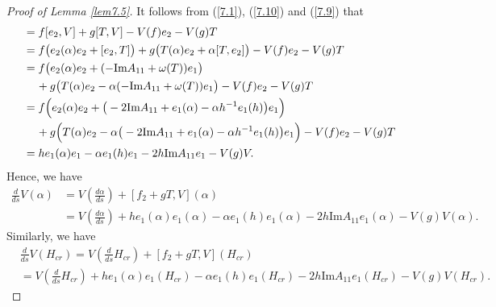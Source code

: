 \documentclass{amsart}
\theoremstyle{Corollary}
\numberwithin{equation}{section}
\begin{document}
\begin{proof}[Proof of Lemma \ref{lem7.5}]
It follows from  (\ref{7.1}), (\ref{7.10}) and (\ref{7.9})  that
\begin{align*}
[f_2+gT,V]
&=f[e_2,V]+g[T,V]-V(f)e_2-V(g)T\\
&=f\big(e_2(\alpha)e_2+[e_2,T]\big)
+g\big(T(\alpha)e_2+\alpha[T,e_2]\big)-V(f)e_2-V(g)T\\
&=f\big(e_2(\alpha)e_2+(-\mbox{Im}A_{11}+\omega(T))e_1\big)\\
&\hspace{4mm}
+g\big(T(\alpha)e_2-\alpha (-\mbox{Im}A_{11}+\omega(T))e_1\big)-V(f)e_2-V(g)T\\
&=f\Big(e_2(\alpha)e_2+\big(-2\mbox{Im}A_{11}+e_1(\alpha)-\alpha h^{-1}e_1(h)\big)e_1\Big)\\
&\hspace{4mm}
+g\Big(T(\alpha)e_2-\alpha\big(-2\mbox{Im}A_{11}+e_1(\alpha)-\alpha h^{-1}e_1(h)\big)e_1\Big)-V(f)e_2-V(g)T\\
&=h e_1(\alpha)e_1-\alpha e_1(h)e_1-2h\mbox{Im}A_{11}e_1
-V(g)V.
\end{align*}  
Hence, we have 
\begin{align*}
\frac{d}{ds}V(\alpha)
&=V\left(\frac{d\alpha}{ds}\right)+[f_2+gT,V](\alpha)\\
&=V\left(\frac{d\alpha}{ds}\right)+h e_1(\alpha)e_1(\alpha)-\alpha e_1(h)e_1(\alpha)-2h\mbox{Im}A_{11}e_1(\alpha)
-V(g)V(\alpha).
\end{align*}
Similarly, we have
\begin{align*}
&\frac{d}{ds}V(H_{cr})=V\left(\frac{d}{ds}H_{cr}\right)+[f_2+gT,V](H_{cr})\\
&=V\left(\frac{d}{ds}H_{cr}\right)+
h e_1(\alpha)e_1(H_{cr})-\alpha e_1(h)e_1(H_{cr})-2h\mbox{Im}A_{11}e_1(H_{cr})
-V(g)V(H_{cr}).
\end{align*}


\end{proof}
\end{document}
